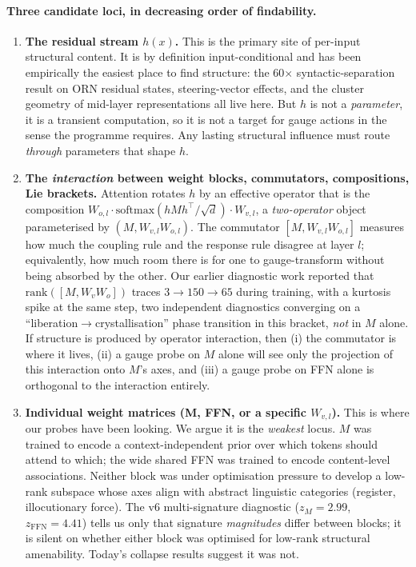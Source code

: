 \documentclass[11pt, a4paper]{article}
\theoremstyle{plain}
\theoremstyle{definition}
\theoremstyle{remark}
\begin{document}
\paragraph{Three candidate loci, in decreasing order of findability.}

\begin{enumerate}[leftmargin=2em]
\item \textbf{The residual stream $h(x)$.}
  This is the primary site of per-input structural content.
  It is by definition input-conditional and has been empirically the easiest place to find structure: the 60$\times$ syntactic-separation result on ORN residual states, steering-vector effects, and the cluster geometry of mid-layer representations all live here.
  But $h$ is not a \emph{parameter}, it is a transient computation, so it is not a target for gauge actions in the sense the programme requires.
  Any lasting structural influence must route \emph{through} parameters that shape $h$.

\item \textbf{The \emph{interaction} between weight blocks, commutators, compositions, Lie brackets.}
  Attention rotates $h$ by an effective operator that is the composition $W_{o,l} \cdot \mathrm{softmax}(h M h^\top / \sqrt{d}) \cdot W_{v,l}$, a \emph{two-operator} object parameterised by $(M, W_{v,l} W_{o,l})$.
  The commutator $[M, W_{v,l} W_{o,l}]$ measures how much the coupling rule and the response rule disagree at layer $l$; equivalently, how much room there is for one to gauge-transform without being absorbed by the other.
  Our earlier diagnostic work reported that $\mathrm{rank}([M, W_v W_o])$ traces $3 \to 150 \to 65$ during training, with a kurtosis spike at the same step, two independent diagnostics converging on a ``liberation$\to$crystallisation'' phase transition in this bracket, \emph{not} in $M$ alone.
  If structure is produced by operator interaction, then (i) the commutator is where it lives, (ii) a gauge probe on $M$ alone will see only the projection of this interaction onto $M$'s axes, and (iii) a gauge probe on FFN alone is orthogonal to the interaction entirely.

\item \textbf{Individual weight matrices (M, FFN, or a specific $W_{v,l}$).}
  This is where our probes have been looking.
  We argue it is the \emph{weakest} locus.
  $M$ was trained to encode a context-independent prior over which tokens should attend to which; the wide shared FFN was trained to encode content-level associations.
  Neither block was under optimisation pressure to develop a low-rank subspace whose axes align with abstract linguistic categories (register, illocutionary force).
  The v6 multi-signature diagnostic ($z_M = 2.99$, $z_{\mathrm{FFN}} = 4.41$) tells us only that signature \emph{magnitudes} differ between blocks; it is silent on whether either block was optimised for low-rank structural amenability.
  Today's collapse results suggest it was not.
\end{enumerate}
\end{document}
